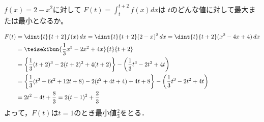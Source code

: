 \begin{problem}
$f(x)=2-x^2$に対して
$\displaystyle F(t)=\int_t^{t+2}f(x)dx$は
$t$のどんな値に対して最大または最小となるか。
\end{problem}

\begin{align*}
  F(t) &= \dint{t}{t+2}f(x)\,dx = \dint{t}{t+2}(2-x)^2\,dx
  =\dint{t}{t+2}(x^2-4x+4)\,dx \\
  &= \teisekibun{\frac13x^3-2x^2+4x}{t}{t+2} \\
  &= \left\{ \frac13(t+2)^3-2(t+2)^2+4(t+2) \right\} -
  \left( \frac13t^3-2t^2+4t \right) \\
  &= \left\{ \frac13(t^3+6t^2+12t+8) -2(t^2+4t+4) + 4t+8 \right\}
  - \left( \frac13t^3-2t^2+4t \right) \\
  &= 2t^2-4t+\frac83 = 2(t-1)^2+\frac23
\end{align*}
よって，$F(t)$は$t=1$のとき最小値$\frac23$をとる．
